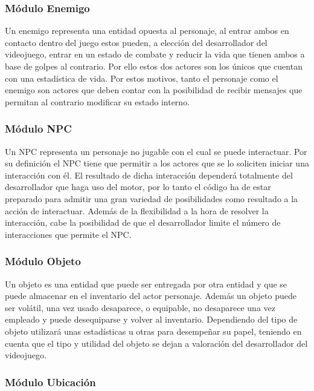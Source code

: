 \subsubsection{Módulo Enemigo}

Un enemigo representa una entidad opuesta al personaje, al entrar ambos en contacto dentro del juego estos pueden, a elección del desarrollador del videojuego, entrar en un estado de combate y reducir la vida que tienen ambos a base de golpes al contrario. Por ello estos dos actores son los únicos que cuentan con una estadística de vida. Por estos motivos, tanto el personaje como el enemigo son actores que deben contar con la posibilidad de recibir mensajes que permitan al contrario modificar su estado interno.
 
\subsubsection{Módulo NPC}

Un NPC representa un personaje no jugable con el cual se puede interactuar. Por su definición el NPC tiene que permitir a los actores que se lo soliciten iniciar una interacción con él. El resultado de dicha interacción dependerá totalmente del desarrollador que haga uso del motor, por lo tanto el código ha de estar preparado para admitir una gran variedad de posibilidades como resultado a la acción de interactuar. Además de la flexibilidad a la hora de resolver la interacción, cabe la posibilidad de que el desarrollador limite el número de interacciones que permite el NPC.

\subsubsection{Módulo Objeto}

Un objeto es una entidad que puede ser entregada por otra entidad y que se puede almacenar en el inventario del actor personaje. Además un objeto puede ser volátil, una vez usado desaparece, o equipable, no desaparece una vez empleado y puede desequiparse y volver al inventario. Dependiendo del tipo de objeto utilizará unas estadísticas u otras para desempeñar su papel, teniendo en cuenta que el tipo y utilidad del objeto se dejan a valoración del desarrollador del videojuego.

\subsubsection{Módulo Ubicación}

